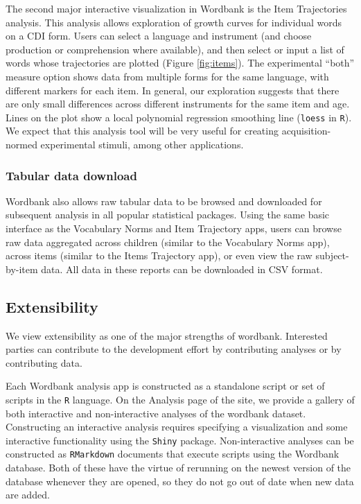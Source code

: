 \documentclass[doc,noapacite]{apa2}
\begin{document}
The second major interactive visualization in Wordbank is the Item Trajectories analysis. This analysis allows exploration of growth curves for individual words on a CDI form. Users can select a language and instrument (and choose production or comprehension where available), and then select or input a list of words whose trajectories are plotted (Figure \ref{fig:items}). The experimental ``both'' measure option shows data from multiple forms for the same language, with different markers for each item. In general, our exploration suggests that there are only small differences across different instruments for the same item and age. Lines on the plot show a local polynomial regression smoothing line (\texttt{loess} in \texttt{R}). We expect that this analysis tool will be very useful for creating acquisition-normed experimental stimuli, among other applications. 

\subsubsection{Tabular data download}

Wordbank also allows raw tabular data to be browsed and downloaded for subsequent analysis in all popular statistical packages. Using the same basic interface as the Vocabulary Norms and Item Trajectory apps, users can browse raw data aggregated across children (similar to the Vocabulary Norms app), across items (similar to the Items Trajectory app), or even view the raw subject-by-item data. All data in these reports can be downloaded in CSV format. 

\subsection{Extensibility}

We view extensibility as one of the major strengths of wordbank. Interested parties can contribute to the development effort by contributing analyses or by contributing data. 


Each Wordbank analysis app is constructed as a standalone script or set of scripts in the \texttt{R} language. On the Analysis page of the site, we provide a gallery of both interactive and non-interactive analyses of the wordbank dataset. Constructing an interactive analysis requires specifying a visualization and some interactive functionality using the \texttt{Shiny} package. Non-interactive analyses can be constructed as \texttt{RMarkdown} documents that execute scripts using the Wordbank database. Both of these have the virtue of rerunning on the newest version of the database whenever they are opened, so they do not go out of date when new data are added. 
\end{document}
